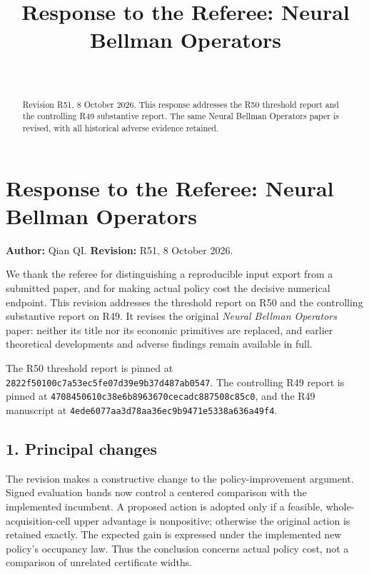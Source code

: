 \documentclass[ecta,nameyear,draft]{econsocart}
\begin{document}
\begin{frontmatter}
\title{Response to the Referee: Neural Bellman Operators}
\begin{aug}
\author[id=au1,addressref={add1}]{~}
\address[id=add1]{Peking University}
\end{aug}
\begin{abstract}Revision R51, 8 October 2026. This response addresses the R50 threshold report and the controlling R49 substantive report. The same Neural Bellman Operators paper is revised, with all historical adverse evidence retained.\end{abstract}
\end{frontmatter}
\hypertarget{response-to-the-referee-neural-bellman-operators}{%
\section{Response to the Referee: Neural Bellman
Operators}\label{response-to-the-referee-neural-bellman-operators}}

\textbf{Author:} Qian QI. \textbf{Revision:} R51, 8 October 2026.

We thank the referee for distinguishing a reproducible input export from
a submitted paper, and for making actual policy cost the decisive
numerical endpoint. This revision addresses the threshold report on R50
and the controlling substantive report on R49. It revises the original
\emph{Neural Bellman Operators} paper: neither its title nor its
economic primitives are replaced, and earlier theoretical developments
and adverse findings remain available in full.

The R50 threshold report is pinned at
\nolinkurl{2822f50100c7a53ec5fe07d39e9b37d487ab0547}. The controlling R49
report is pinned at \nolinkurl{4708450610c38e6b8963670cecadc887508c85c0},
and the R49 manuscript at
\nolinkurl{4ede6077aa3d78aa36ec9b9471e5338a636a49f4}.

\hypertarget{principal-changes}{%
\subsection{1. Principal changes}\label{principal-changes}}

The revision makes a constructive change to the policy-improvement
argument. Signed evaluation bands now control a centered comparison with
the implemented incumbent. A proposed action is adopted only if a
feasible, whole-acquisition-cell upper advantage is nonpositive;
otherwise the original action is retained exactly. The expected gain is
expressed under the implemented new policy's occupancy law. Thus the
conclusion concerns actual policy cost, not a comparison of unrelated
certificate widths.
\end{document}

